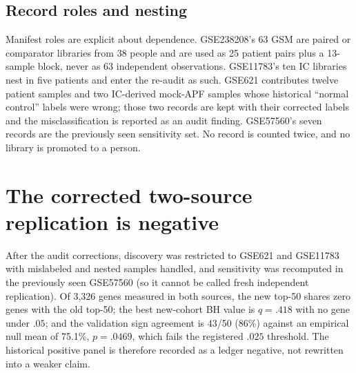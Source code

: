 \documentclass[11pt,a4paper]{article}
\begin{document}
\subsection{Record roles and nesting}
Manifest roles are explicit about dependence. GSE238208's 63 GSM are paired or
comparator libraries from 38 people and are used as 25 patient pairs plus a
13-sample block, never as 63 independent observations. GSE11783's ten IC
libraries nest in five patients and enter the re-audit as such. GSE621
contributes twelve patient samples and two IC-derived mock-APF samples whose
historical ``normal control'' labels were wrong; those two records are kept
with their corrected labels and the misclassification is reported as an audit
finding. GSE57560's seven records are the previously seen sensitivity set.
No record is counted twice, and no library is promoted to a person.

\section{The corrected two-source replication is negative}\label{sec:twosource}
After the audit corrections, discovery was restricted to GSE621 and GSE11783
with mislabeled and nested samples handled, and sensitivity was recomputed in
the previously seen GSE57560 (so it cannot be called fresh independent
replication). Of 3,326 genes measured in both sources, the new top-50 shares
zero genes with the old top-50; the best new-cohort BH value is $q=.418$ with
no gene under $.05$; and the validation sign agreement is 43/50 (86\%) against
an empirical null mean of 75.1\%, $p=.0469$, which fails the registered $.025$
threshold. The historical positive panel is therefore recorded as a ledger
negative, not rewritten into a weaker claim.
\end{document}
